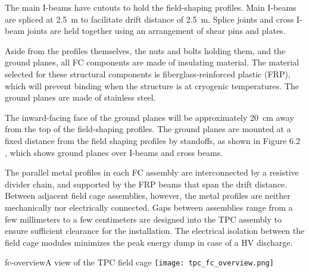 The main I-beams have cutouts to hold the field-shaping profiles. Main I-beams are spliced at 2.5~m to facilitate drift distance %
of 2.5~m. Splice joints and cross I-beam joints are held together using an arrangement of shear pins and plates. 

Aside from the profiles themselves, the nuts and bolts holding them, and the ground planes, all FC components are made of insulating material. The material selected for these structural components is fiberglass-reinforced plastic (FRP), which will prevent binding when the structure is at cryogenic temperatures. The ground planes are made of stainless steel. 


The inward-facing face of the ground planes will be approximately 20~cm away from the top of the field-shaping profiles. The ground planes are mounted at a fixed distance from the field shaping profiles by standoffs, as shown in Figure 6.2 , which shows ground planes over I-beams and cross beams.

The parallel metal profiles in each FC assembly 
 are interconnected by a resistive divider chain, and supported by the FRP beams that span the drift distance.  Between adjacent field cage assemblies, however,  
the metal profiles are neither mechanically nor electrically connected. Gaps between assemblies range from a few millimeters to a few centimeters are designed into the TPC assembly to ensure sufficient clearance for the installation.  The electrical isolation between the field cage modules minimizes the peak energy dump in case of a HV discharge.


\begin{cdrfigure}{fc-overview}{A view of the TPC field cage}
\texttt{[image: tpc\_fc\_overview.png]}
\end{cdrfigure}

